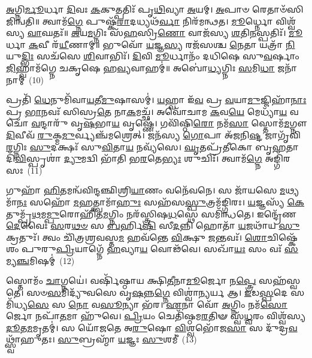 {\anuvakamend[{\-\ul{𑌪𑍍𑌰}\-𑌮𑍍𑌲𑍋𑌚᳴𑌨𑍍𑌤𑍀 \ul{𑌚} 𑌯𑍟 \ul{𑌸𑍍𑌵}\-𑌸𑍍𑌤𑍍𑌯𑌾𑌷𑍍𑌟𑌾𑌵𑌿𑍞᳴𑌶𑌤𑌿𑌶𑍍𑌚}]}%

\-\ul{𑌅}\-𑌗𑍍𑌨𑌿\-\ul{𑌰𑍍𑌮𑍂}\-𑌰𑍍𑌧𑌾 \ul{𑌦𑌿}\-𑌵𑌃 \ul{𑌕}\-𑌕𑍁𑌤𑍍𑌪𑌤𑌿𑌃᳴ 𑌪𑍃\-\ul{𑌥𑌿}\-𑌵𑍍𑌯𑌾 \ul{𑌅}\-𑌯𑌮𑍍। \ul{𑌅}\-𑌪𑌾𑍞 𑌰𑍇𑌤𑌾𑍞᳴𑌸𑌿 𑌜𑌿𑌨𑍍𑌵𑌤𑌿॥ 𑌤𑍍𑌵𑌾𑌮᳴\-\ul{𑌗𑍍𑌨𑍇} 𑌪𑍁𑌷𑍍𑌕᳴\-\ul{𑌰𑌾}\-𑌦𑌧𑍍𑌯𑌥᳴\-\ul{𑌰𑍍𑌵𑌾} 𑌨𑌿𑌰᳴𑌮𑌨𑍍𑌥𑌤। \ul{𑌮𑍂}\-𑌰𑍍𑌧𑍍𑌨𑍋 𑌵𑌿𑌶𑍍𑌵᳴𑌸𑍍𑌯 \ul{𑌵𑌾}\-𑌘𑌤𑌃᳴॥ \ul{𑌅}\-𑌯\-\ul{𑌮}\-𑌗𑍍𑌨𑌿𑌃 𑌸᳴\-\ul{𑌹}\-𑌸𑍍𑌰𑌿\-\ul{𑌣𑍋} 𑌵𑌾𑌜᳴𑌸𑍍𑌯 \ul{𑌶}\-𑌤𑌿\-\ul{𑌨}\-𑌸𑍍𑌪𑌤𑌿𑌃᳴। \ul{𑌮𑍂}\-𑌰𑍍𑌧𑌾 \ul{𑌕}\-𑌵𑍀 𑌰᳴\-\ul{𑌯𑍀}\-𑌣𑌾𑌮𑍍॥ 𑌭𑍁𑌵𑍋᳴ \ul{𑌯}\-𑌜𑍍𑌞\-\ul{𑌸𑍍𑌯} 𑌰𑌜᳴𑌸𑌶𑍍𑌚 \ul{𑌨𑍇}\-𑌤𑌾 𑌯𑌤𑍍𑌰𑌾᳴ \ul{𑌨𑌿}\-𑌯𑍁\-\ul{𑌦𑍍𑌭𑌿𑌃} 𑌸𑌚᳴𑌸𑍇 \ul{𑌶𑌿}\-𑌵𑌾𑌭𑌿𑌃᳴। \ul{𑌦𑌿}\-𑌵𑌿 \ul{𑌮𑍂}\-𑌰𑍍𑌧𑌾𑌨𑌂᳴ 𑌦𑌧𑌿𑌷𑍇 𑌸𑍁\-\ul{𑌵}\-𑌰𑍍\mbox{}𑌷𑌾𑌂 \ul{𑌜𑌿}\-𑌹𑍍𑌵𑌾𑌮᳴𑌗𑍍𑌨𑍇 𑌚𑌕𑍃𑌷𑍇 𑌹\-\ul{𑌵𑍍𑌯}\-𑌵𑌾𑌹𑌮𑍍॑॥ 𑌅𑌬𑍋॑\-\ul{𑌧𑍍𑌯}\-𑌗𑍍𑌨𑌿𑌃 \ul{𑌸}\-𑌮𑌿\-\ul{𑌧𑌾} 𑌜𑌨𑌾᳴𑌨𑌾𑌮𑍍~(10)

𑌪𑍍𑌰𑌤𑌿᳴ \ul{𑌧𑍇}\-𑌨𑍁𑌮𑌿᳴𑌵𑌾\-\ul{𑌯}\-𑌤𑍀\-\ul{𑌮𑍁}\-𑌷𑌾𑌸𑌮𑍍॑। \ul{𑌯}\-𑌹𑍍𑌵𑌾 𑌇᳴\-\ul{𑌵} 𑌪𑍍𑌰 \ul{𑌵}\-𑌯𑌾\-\ul{𑌮𑍁}\-𑌜𑍍𑌜𑌿𑌹𑌾᳴\-\ul{𑌨𑌾𑌃} 𑌪𑍍𑌰 \ul{𑌭𑌾}\-𑌨𑌵𑌃᳴ 𑌸𑌿𑌸𑍍𑌰\-\ul{𑌤𑍇} 𑌨𑌾\-\ul{𑌕}\-𑌮𑌚𑍍𑌛᳴। 𑌅𑌵𑍋᳴𑌚𑌾𑌮 \ul{𑌕}\-𑌵\-\ul{𑌯𑍇} 𑌮𑍇𑌧𑍍𑌯𑌾᳴\-\ul{𑌯} 𑌵𑌚𑍋᳴ \ul{𑌵}\-𑌨𑍍𑌦𑌾𑌰𑍁᳴ 𑌵𑍃\-\ul{𑌷}\-𑌭𑌾\-\ul{𑌯} 𑌵𑍃𑌷𑍍𑌣𑍇॑। 𑌗𑌵𑌿᳴𑌷𑍍𑌠𑌿\-\ul{𑌰𑍋} 𑌨𑌮᳴\-\ul{𑌸𑌾} 𑌸𑍍𑌤𑍋𑌮᳴\-\ul{𑌮}\-𑌗𑍍𑌨𑍗 \ul{𑌦𑌿}\-𑌵𑍀𑌵᳴ \ul{𑌰𑍁}\-𑌕𑍍𑌮\-\ul{𑌮𑍁}\-𑌰𑍍𑌵𑍍𑌯𑌞𑍍𑌚᳴𑌮𑌶𑍍𑌰𑍇𑌤𑍍। 𑌜𑌨᳴𑌸𑍍𑌯 \ul{𑌗𑍋}\-𑌪𑌾 𑌅᳴𑌜𑌨𑌿\-\ul{𑌷𑍍𑌟} 𑌜𑌾𑌗𑍃᳴𑌵𑌿\-\ul{𑌰}\-𑌗𑍍𑌨𑌿𑌃 \ul{𑌸𑍁}\-𑌦𑌕𑍍𑌷𑌃᳴ 𑌸𑍁\-\ul{𑌵𑌿}\-𑌤𑌾\-\ul{𑌯} 𑌨𑌵𑍍𑌯᳴𑌸𑍇। \ul{𑌘𑍃}\-𑌤𑌪𑍍𑌰᳴𑌤𑍀𑌕𑍋 𑌬𑍃\-\ul{𑌹}\-𑌤𑌾 𑌦𑌿᳴\-\ul{𑌵𑌿}\-𑌸𑍍𑌪𑍃𑌶𑌾॑ \ul{𑌦𑍍𑌯𑍁}\-𑌮𑌦𑍍𑌵𑌿 𑌭𑌾᳴𑌤𑌿 𑌭\-\ul{𑌰}\-𑌤𑍇\-\ul{𑌭𑍍𑌯𑌃} 𑌶𑍁𑌚𑌿𑌃᳴। 𑌤𑍍𑌵𑌾𑌮᳴\-\ul{𑌗𑍍𑌨𑍇} 𑌅𑌙𑍍𑌗𑌿᳴𑌰𑌸𑌃~(11)

𑌗𑍁𑌹𑌾᳴ \ul{𑌹𑌿}\-𑌤𑌮𑌨𑍍𑌵᳴𑌵𑌿𑌨𑍍𑌦𑌞𑍍𑌛𑌿𑌶𑍍𑌰𑌿\-\ul{𑌯𑌾}\-𑌣𑌂 𑌵𑌨𑍇᳴𑌵𑌨𑍇। 𑌸 𑌜𑌾᳴𑌯𑌸𑍇 \ul{𑌮}\-𑌥𑍍𑌯𑌮𑌾᳴\-\ul{𑌨𑌃} 𑌸𑌹𑍋᳴ \ul{𑌮}\-𑌹𑌤𑍍𑌤𑍍𑌵𑌾𑌮𑌾᳴\-\ul{𑌹𑍁𑌃} 𑌸𑌹᳴𑌸\-\ul{𑌸𑍍𑌪𑍁}\-𑌤𑍍𑌰𑌮᳴𑌙𑍍𑌗𑌿𑌰𑌃। \ul{𑌯}\-𑌜𑍍𑌞𑌸𑍍𑌯᳴ \ul{𑌕𑍇}\-𑌤𑍁𑌮𑍍𑌪𑍍𑌰᳴\-\ul{𑌥}\-𑌮\-\ul{𑌮𑍍𑌪𑍁}\-𑌰𑍋𑌹𑌿᳴𑌤\-\ul{𑌮}\-𑌗𑍍𑌨𑌿𑌂 𑌨𑌰᳴𑌸𑍍𑌤𑍍𑌰𑌿𑌷\-\ul{𑌧}\-𑌸𑍍𑌥𑍇 𑌸𑌮𑌿᳴𑌨𑍍𑌧𑌤𑍇। 𑌇𑌨𑍍𑌦𑍍𑌰𑍇᳴𑌣 \ul{𑌦𑍇}\-𑌵𑍈𑌃 \ul{𑌸}\-𑌰\-\ul{𑌥}\-\-\ul{𑍞} 𑌸 \ul{𑌬}\-𑌰𑍍\mbox{}𑌹𑌿\-\ul{𑌷𑌿} 𑌸𑍀\-\ul{𑌦}\-𑌨𑍍𑌨𑌿 𑌹𑍋𑌤𑌾᳴ \ul{𑌯}\-𑌜𑌥𑌾᳴𑌯 \ul{𑌸𑍁}\-𑌕𑍍𑌰𑌤𑍁𑌃᳴। 𑌤𑍍𑌵𑌂 𑌚𑌿᳴𑌤𑍍𑌰𑌶𑍍𑌰𑌵𑌸𑍍𑌤\-\ul{𑌮} 𑌹𑌵᳴𑌨𑍍𑌤𑍇 \ul{𑌵𑌿}\-𑌕𑍍𑌷𑍁 \ul{𑌜}\-𑌨𑍍𑌤𑌵𑌃᳴। \ul{𑌶𑍋}\-𑌚𑌿𑌷𑍍𑌕𑍇᳴𑌶𑌂 𑌪𑍁𑌰𑍁\-\ul{𑌪𑍍𑌰𑌿}\-𑌯𑌾𑌗𑍍𑌨𑍇᳴ \ul{𑌹}\-𑌵𑍍𑌯𑌾\-\ul{𑌯} 𑌵𑍋𑌢᳴𑌵𑍇। 𑌸𑌖𑌾᳴\-\ul{𑌯𑌃} 𑌸𑌂 𑌵𑌃᳴ \ul{𑌸}\-𑌮𑍍𑌯\-\ul{𑌞𑍍𑌚}\-𑌮𑌿𑌷𑌮𑍍॑~(12)

𑌸𑍍𑌤𑍋𑌮𑌂᳴ \ul{𑌚𑌾}\-𑌗𑍍𑌨𑌯𑍇॑। 𑌵𑌰𑍍\mbox{}𑌷𑌿᳴𑌷𑍍𑌠𑌾𑌯 𑌕𑍍𑌷𑌿\-\ul{𑌤𑍀}\-𑌨𑌾\-\ul{𑌮𑍂}\-𑌰𑍍𑌜𑍋 𑌨\-\ul{𑌪𑍍𑌤𑍍𑌰𑍇} 𑌸𑌹᳴𑌸𑍍𑌵𑌤𑍇। 𑌸𑍞\-\ul{𑌸}\-𑌮𑌿𑌦𑍍𑌯𑍁᳴𑌵𑌸𑍇 𑌵𑍃\-\ul{𑌷}\-𑌨𑍍𑌨\-\ul{𑌗𑍍𑌨𑍇} 𑌵𑌿𑌶𑍍𑌵𑌾॑\-\ul{𑌨𑍍𑌯}\-𑌰𑍍𑌯 𑌆। \ul{𑌇}\-𑌡\-\ul{𑌸𑍍𑌪}\-𑌦𑍇 𑌸𑌮𑌿᳴𑌧𑍍𑌯\-\ul{𑌸𑍇} 𑌸 \ul{𑌨𑍋} 𑌵\-\ul{𑌸𑍂}\-𑌨𑍍𑌯𑌾 𑌭᳴𑌰। \ul{𑌏}\-𑌨𑌾 𑌵𑍋᳴ \ul{𑌅}\-𑌗𑍍𑌨𑌿𑌂 𑌨𑌮᳴\-\ul{𑌸𑍋}\-𑌰𑍍𑌜𑍋 𑌨𑌪𑌾᳴\-\ul{𑌤}\-𑌮𑌾 𑌹𑍁᳴𑌵𑍇। \ul{𑌪𑍍𑌰𑌿}\-𑌯𑌂 𑌚𑍇𑌤𑌿᳴𑌷𑍍𑌠𑌮\-\ul{𑌰}\-𑌤𑌿𑍟 𑌸𑍍𑌵᳴\-\ul{𑌧𑍍𑌵}\-𑌰𑌂 𑌵𑌿𑌶𑍍𑌵᳴𑌸𑍍𑌯 \ul{𑌦𑍂}\-𑌤\-\ul{𑌮}\-𑌮𑍃𑌤𑌮𑍍॑। 𑌸 𑌯𑍋᳴𑌜𑌤𑍇 𑌅\-\ul{𑌰𑍁}\-𑌷𑍋 \ul{𑌵𑌿}\-𑌶𑍍𑌵𑌭𑍋᳴𑌜\-\ul{𑌸𑌾} 𑌸 𑌦𑍁᳴𑌦𑍍𑌰\-\ul{𑌵}\-𑌥𑍍𑌸𑍍𑌵𑌾᳴𑌹𑍁𑌤𑌃। \ul{𑌸𑍁}\-𑌬𑍍𑌰𑌹𑍍𑌮𑌾᳴ \ul{𑌯}\-𑌜𑍍𑌞𑌃 \ul{𑌸𑍁}\-𑌶𑌮𑍀॑~(13)

